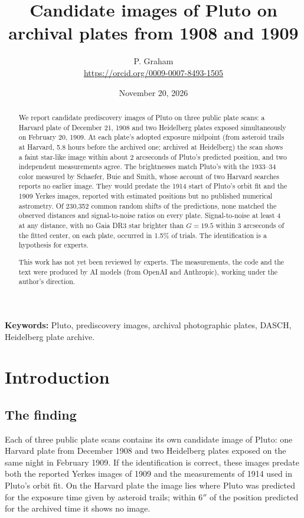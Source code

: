 \documentclass[11pt]{article}
\title{Candidate images of Pluto on archival plates from 1908 and 1909}
\author{P. Graham\\ \small\url{https://orcid.org/0009-0007-8493-1505}}
\date{November 20, 2026}
\begin{document}
\maketitle
\begin{abstract}
We report candidate prediscovery images of Pluto on three public plate scans: a Harvard plate of December 21, 1908 and two Heidelberg plates exposed simultaneously on February 20, 1909. At each plate's adopted exposure midpoint (from asteroid trails at Harvard, 5.8 hours before the archived one; archived at Heidelberg) the scan shows a faint star-like image within about 2 arcseconds of Pluto's predicted position, and two independent measurements agree. The brightnesses match Pluto's with the 1933--34 color measured by Schaefer, Buie and Smith, whose account of two Harvard searches reports no earlier image. They would predate the 1914 start of Pluto's orbit fit and the 1909 Yerkes images, reported with estimated positions but no published numerical astrometry. Of 230,352 common random shifts of the predictions, none matched the observed distances and signal-to-noise ratios on every plate. Signal-to-noise at least 4 at any distance, with no Gaia DR3 star brighter than $G=19.5$ within 3 arcseconds of the fitted center, on each plate, occurred in 1.5\% of trials. The identification is a hypothesis for experts.

This work has not yet been reviewed by experts.
The measurements, the code and the text were produced by AI models (from OpenAI and Anthropic), working under the author's direction.
\end{abstract}
\medskip
\noindent\textbf{Keywords:} Pluto, prediscovery images, archival photographic plates, DASCH, Heidelberg plate archive.

\section{Introduction}

\subsection{The finding}
Each of three public plate scans contains its own candidate image of Pluto: one Harvard plate from December 1908 and two Heidelberg plates exposed on the same night in February 1909. If the identification is correct, these images predate both the reported Yerkes images of 1909 and the measurements of 1914 used in Pluto's orbit fit. On the Harvard plate the image lies where Pluto was predicted for the exposure time given by asteroid trails; within $6''$ of the position predicted for the archived time it shows no image.
\end{document}
